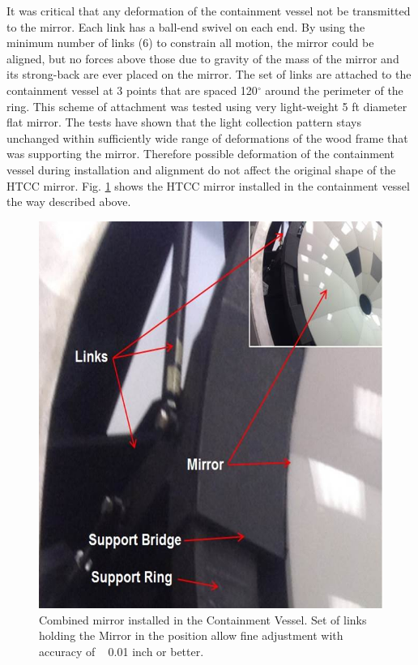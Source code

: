 It was critical that any deformation of the containment vessel not be transmitted to the mirror. Each link has a ball-end swivel on each end. By using the minimum number of links (6) to constrain all motion, the mirror could be aligned, but no forces above those due to gravity of the mass of the mirror and its strong-back are ever placed on the mirror. The set of links are attached to the containment vessel at 3 points that are spaced 120$^\circ$ around the perimeter of the ring. This scheme of attachment was tested using very light-weight 5 ft diameter flat mirror. The tests have shown that the light collection pattern stays unchanged within sufficiently wide range of deformations of the wood frame that was supporting the mirror. Therefore possible deformation of the containment vessel during installation and alignment do not affect the original shape of the HTCC mirror. Fig. \ref{fig:HTCC_MIRR_INST_NEW} shows the HTCC mirror installed in the containment vessel the way described above.

\begin{figure}[ht]
    \centering
    \includegraphics[width=1.0\linewidth,trim={0 0cm 0 0},clip]{images/HTCC_MIRR_INST_NEW.jpg}
    \caption{Combined mirror installed in the Containment Vessel. Set of links holding the Mirror in the position allow fine adjustment with accuracy of ~ 0.01 inch or better.}
    \label{fig:HTCC_MIRR_INST_NEW}
\end{figure}

